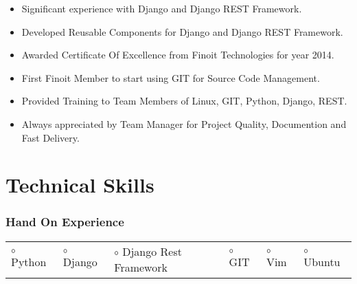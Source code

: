 \documentclass[12pt]{article}
\begin{document}
\begin{itemize}
 \item Significant experience with Django and Django REST Framework.
 \item Developed Reusable Components for Django and Django REST Framework.
 \item Awarded Certificate Of Excellence from Finoit Technologies for year 2014.
 \item First Finoit Member to start using GIT for Source Code Management.
 \item Provided Training to Team Members of Linux, GIT, Python, Django, REST.
 \item Always appreciated by Team Manager for Project Quality, Documention and Fast Delivery.
     \begin{comment}
 \item Always follow best practices, write well formatted and documented code.
 \item Prefer to deliver documentation along with product. Work hard to meet the deadlines.
 \item Prefer playing with the code in shell, before writing it in the module.
 \item Mostly prefer quality over quantity. Good quality reduces maintenance cost, and increases productivity. In case of urgency of task completion, may compromise with quality for short period of time, but later its taken care of.
 \item Prefer to work based on DRY principle, i.e. writing mixins and utils and plugging these directly instead of writing repetitive code.
 \item Enjoy working on Linux Server, GIT as Source Code Management Tool and Vim as Text-Editor.
     \end{comment}
\end{itemize}


\section*{Technical Skills}

\subsubsection*{Hand On Experience}

\begin{tabular}{l l l l l l}
 $\circ$ Python &
 $\circ$ Django &
 $\circ$ Django Rest Framework &
 $\circ$ GIT &
 $\circ$ Vim &
 $\circ$ Ubuntu \\
\end{tabular}
\end{document}
